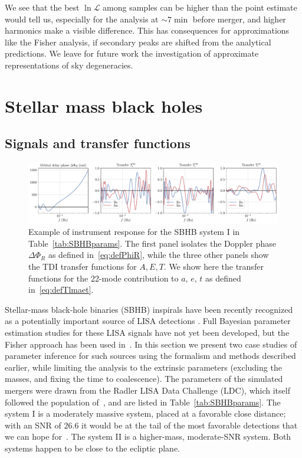 \documentclass[aps,showpacs,twocolumn,prd,superscriptaddress,nofootinbib]{revtex4-1}
\newcommand\calL{{\mathcal{L}}}
\begin{document}
We see that the best $\ln \calL$ among samples can be higher than the point estimate would tell us, especially for the analysis at $\sim 7 \min$ before merger, and higher harmonics make a visible difference. This has consequences for approximations like the Fisher analysis, if secondary peaks are shifted from the analytical predictions. We leave for future work the investigation of approximate representations of sky degeneracies.


\section{Stellar mass black holes}
\label{sec:SBHB}


\subsection{Signals and transfer functions}
\label{subsec:signaltransferSBHB}

\begin{figure}
  \centering
  \includegraphics[width=.98\linewidth]{../plots/plot_sobh1_tdi.pdf}
  \caption{Example of instrument response for the SBHB system I in Table~\ref{tab:SBHBparams}. The first panel isolates the Doppler phase $\Delta\Phi_{R}$ as defined in~\eqref{eq:defPhiR}, while the three other panels show the TDI transfer functions for $A,E,T$. We show here the transfer functions for the 22-mode contribution to $a$, $e$, $t$ as defined in~\eqref{eq:defTlmaet}.}
  \label{fig:transferSBHBcaseI}
\end{figure}

Stellar-mass black-hole binaries (SBHB) inspirals have been recently recognized as a potentially
important source of LISA detections \cite{Sesana16, Vitale16}. Full Bayesian parameter
estimation studies for these LISA signals have not yet been developed, but the Fisher approach has been used in~\cite{Sesana16, Vitale16, Nishizawa+16a, Nishizawa+16b}. In this section we present two case
studies of parameter inference for such sources using the formalism and methods
described earlier, while limiting the analysis to the extrinsic parameters (excluding the masses, and fixing the time to coalescence). The parameters of the simulated mergers were drawn from the Radler LISA Data Challenge (LDC), which itself followed the population of~\cite{Sesana16}, and are listed in Table~\ref{tab:SBHBparams}. The system I is a moderately massive system, placed at a favorable close distance; with an SNR of $26.6$ it would be at the tail of the most favorable detections that we can hope for~\cite{Sesana16, Gerosa+19, Moore+19}. The system II is a higher-mass, moderate-SNR system. Both systems happen to be close to the ecliptic plane.
\end{document}
